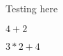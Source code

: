                                                                                                                                                                                                                                                                                          \documentclass{article}
\begin{document}
Testing here

$4 + 2$

$3 * 2 + 4$
\end{document}
